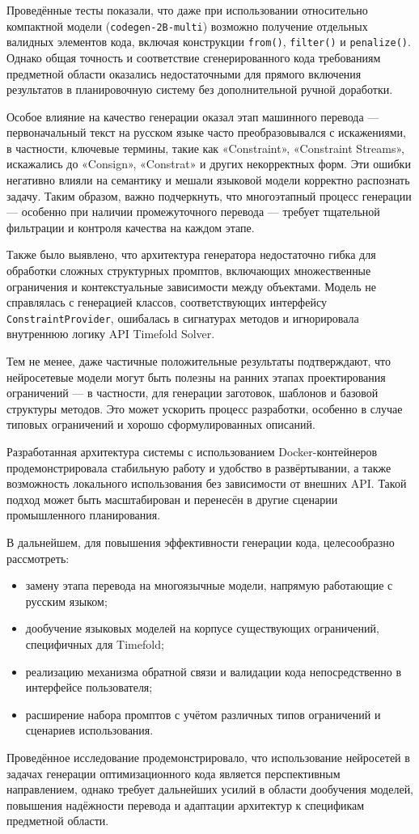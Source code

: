 Проведённые тесты показали, что даже при использовании относительно компактной модели (\texttt{codegen-2B-multi}) возможно получение отдельных валидных элементов кода, включая конструкции \texttt{from()}, \texttt{filter()} и \texttt{penalize()}. Однако общая точность и соответствие сгенерированного кода требованиям предметной области оказались недостаточными для прямого включения результатов в планировочную систему без дополнительной ручной доработки.

Особое влияние на качество генерации оказал этап машинного перевода — первоначальный текст на русском языке часто преобразовывался с искажениями, в частности, ключевые термины, такие как «Constraint», «Constraint Streams», искажались до «Consign», «Constrat» и других некорректных форм. Эти ошибки негативно влияли на семантику и мешали языковой модели корректно распознать задачу. Таким образом, важно подчеркнуть, что многоэтапный процесс генерации — особенно при наличии промежуточного перевода — требует тщательной фильтрации и контроля качества на каждом этапе.

Также было выявлено, что архитектура генератора недостаточно гибка для обработки сложных структурных промптов, включающих множественные ограничения и контекстуальные зависимости между объектами. Модель не справлялась с генерацией классов, соответствующих интерфейсу \texttt{ConstraintProvider}, ошибалась в сигнатурах методов и игнорировала внутреннюю логику API Timefold Solver.

Тем не менее, даже частичные положительные результаты подтверждают, что нейросетевые модели могут быть полезны на ранних этапах проектирования ограничений — в частности, для генерации заготовок, шаблонов и базовой структуры методов. Это может ускорить процесс разработки, особенно в случае типовых ограничений и хорошо сформулированных описаний.

Разработанная архитектура системы с использованием Docker-контейнеров продемонстрировала стабильную работу и удобство в развёртывании, а также возможность локального использования без зависимости от внешних API. Такой подход может быть масштабирован и перенесён в другие сценарии промышленного планирования.

В дальнейшем, для повышения эффективности генерации кода, целесообразно рассмотреть:

\begin{itemize}
\item замену этапа перевода на многоязычные модели, напрямую работающие с русским языком;
\item дообучение языковых моделей на корпусе существующих ограничений, специфичных для Timefold;
\item реализацию механизма обратной связи и валидации кода непосредственно в интерфейсе пользователя;
\item расширение набора промптов с учётом различных типов ограничений и сценариев использования.
\end{itemize}

Проведённое исследование продемонстрировало, что использование нейросетей в задачах генерации оптимизационного кода является перспективным направлением, однако требует дальнейших усилий в области дообучения моделей, повышения надёжности перевода и адаптации архитектур к спецификам предметной области.
